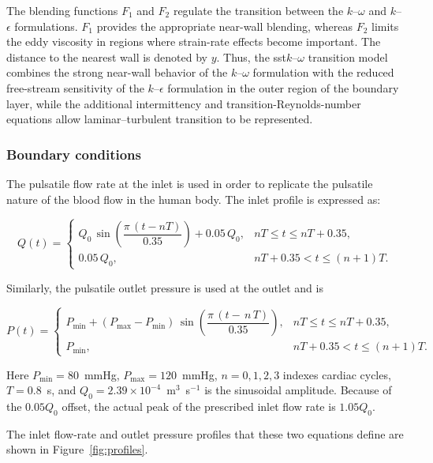 \documentclass[12pt,a4paper]{article}
\newcommand{\SST}{\ac{sst}\xspace}
\theoremstyle{definition}
\numberwithin{equation}{section}
\begin{document}
The blending functions \(F_1\) and \(F_2\) regulate the transition between the \(k\)--\(\omega\) and \(k\)--\(\epsilon\) formulations. \(F_1\) provides the appropriate near-wall blending, whereas \(F_2\) limits the eddy viscosity in regions where strain-rate effects become important. The distance to the nearest wall is denoted by \(y\). Thus, the \SST \(k\)--\(\omega\) transition model combines the strong near-wall behavior of the \(k\)--\(\omega\) formulation with the reduced free-stream sensitivity of the \(k\)--\(\epsilon\) formulation in the outer region of the boundary layer, while the additional intermittency and transition-Reynolds-number equations allow laminar--turbulent transition to be represented.




\subsubsection{Boundary conditions}
The pulsatile flow rate at the inlet is used in order to replicate the pulsatile nature of the blood flow in the human body. The inlet profile is expressed as:

\begin{equation}
Q(t)=
\begin{cases}
Q_0\,\sin\!\left(\dfrac{\pi\,(t-nT)}{0.35}\right)+0.05\,Q_0,
& nT \le t \le nT+0.35, \\[6pt]
0.05\,Q_0,
& nT+0.35 < t \le (n+1)T.
\end{cases}
\end{equation}


Similarly, the pulsatile outlet pressure is used at the outlet and is

\begin{equation}
P(t) =
\begin{cases} 
P_\mathrm{min} + \left(P_\mathrm{max} - P_\mathrm{min}\right) \, \sin\left(\dfrac{\pi \, (t - \, n \, T)}{0.35}\right), & nT \le t \le nT+0.35, \\
P_\mathrm{min}, & nT+0.35 < t \le (n+1)T.
\end{cases}
\end{equation}

Here $P_{\mathrm{min}}=80$~mmHg, $P_{\mathrm{max}}=120$~mmHg, $n=0,1,2,3$ indexes cardiac cycles, $T=0.8$~s, and $Q_0=2.39\times10^{-4}$~m$^3$~s$^{-1}$ is the sinusoidal amplitude. Because of the $0.05Q_0$ offset, the actual peak of the prescribed inlet flow rate is $1.05Q_0$.

{The inlet flow-rate and outlet pressure profiles that these two equations define are shown in Figure~\ref{fig:profiles}.}
\end{document}

